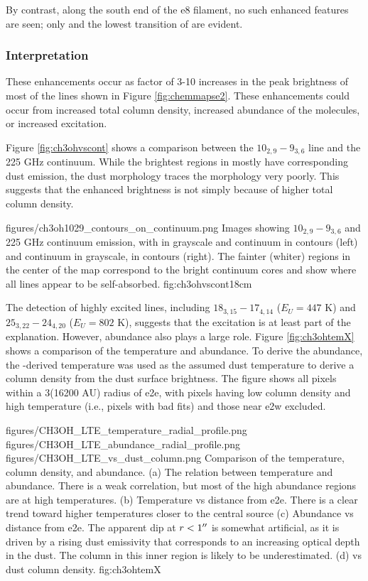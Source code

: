 \documentclass{aa}
\begin{document}
By contrast, along the south end of the e8 filament, no such enhanced features
are seen; only \formaldehyde and the lowest transition of \methanol are
evident.

\subsubsection{Interpretation}
These enhancements occur as factor of 3-10 increases in the peak brightness of
most of the lines shown in Figure \ref{fig:chemmapse2}.  These enhancements
could occur from increased total column density, increased abundance of the
molecules, or increased excitation.

Figure \ref{fig:ch3ohvscont} shows a comparison between the \methanol
$10_{2,9}-9_{3,6}$ line and the 225 GHz continuum.  While the brightest regions
in \methanol mostly have corresponding dust emission, the dust morphology
traces the \methanol morphology very poorly.  This suggests that the enhanced
brightness is not simply because of higher total column density.

          {figures/ch3oh1029_contours_on_continuum.png}
{Images showing \methanol $10_{2,9}-9_{3,6}$ and 225 GHz continuum emission,
with \methanol in grayscale and continuum in contours (left) and continuum in
grayscale, \methanol in contours (right).  The fainter (whiter) regions in the center
of the \methanol map correspond to the bright continuum cores and show where all lines
appear to be self-absorbed.}
{fig:ch3ohvscont}{1}{8cm}

The detection of highly excited \methanol lines, including
$18_{3,15}-17_{4,14}$ ($E_U=447$ K) and $25_{3,22}-24_{4,20}$ ($E_U=802$ K),
suggests that the excitation is at least part of the explanation.  However,
abundance also plays a large role.  Figure \ref{fig:ch3ohtemX} shows a comparison
of the \methanol temperature and abundance.  To derive the abundance, the 
\methanol-derived temperature was used as the assumed dust temperature to derive
a column density from the dust surface brightness.  The figure shows all pixels
within a 3\arcsec (16200 AU) radius of e2e, with pixels having low column density
and high temperature (i.e., pixels with bad fits) and those near e2w excluded.

{figures/CH3OH_LTE_temperature_radial_profile.png}
{figures/CH3OH_LTE_abundance_radial_profile.png}
{figures/CH3OH_LTE_vs_dust_column.png}
{Comparison of the \methanol temperature, column density, and abundance.
(a) The relation between temperature and abundance.  There is a weak correlation,
but most of the high abundance regions are at high temperatures.
(b) Temperature vs distance from e2e.  There is a clear trend toward higher
temperatures closer  to the central source
(c) Abundance vs distance from e2e.  The apparent dip at $r<1\mbox{$^{\prime\prime}$}$ is
somewhat artificial, as it is driven by a rising dust emissivity that
corresponds to an increasing optical depth in the dust.  The \methanol column
in this inner region is likely to be underestimated. 
(d) \methanol vs dust column density.  }
{fig:ch3ohtemX}
\end{document}
